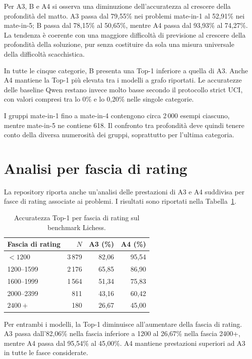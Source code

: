 Per A3, B e A4 si osserva una diminuzione dell'accuratezza al crescere della profondità del matto. A3 passa dal 79,55\% nei problemi mate-in-1 al 52,91\% nei mate-in-5; B passa dal 78,15\% al 50,65\%, mentre A4 passa dal 93,93\% al 74,27\%. La tendenza è coerente con una maggiore difficoltà di previsione al crescere della profondità della soluzione, pur senza costituire da sola una misura universale della difficoltà scacchistica.

In tutte le cinque categorie, B presenta una Top-1 inferiore a quella di A3. Anche A4 mantiene la Top-1 più elevata tra i modelli a grafo riportati. Le accuratezze delle baseline Qwen restano invece molto basse secondo il protocollo strict UCI, con valori compresi tra lo 0\% e lo 0,20\% nelle singole categorie.

I gruppi mate-in-1 fino a mate-in-4 contengono circa 2\,000 esempi ciascuno, mentre mate-in-5 ne contiene 618. Il confronto tra profondità deve quindi tenere conto della diversa numerosità dei gruppi, soprattutto per l'ultima categoria.

\section{Analisi per fascia di rating}

La repository riporta anche un'analisi delle prestazioni di A3 e A4 suddivisa per fasce di rating associate ai problemi. I risultati sono riportati nella Tabella~\ref{tab:rating-results}.

\begin{table}[htbp]
    \centering
    \small
    \caption{Accuratezza Top-1 per fascia di rating sul benchmark Lichess.}
    \label{tab:rating-results}
    \begin{tabular}{lrrr}
        \toprule
        Fascia di rating & \(N\) & A3 (\%) & A4 (\%) \\
        \midrule
        \(<1200\)       & 3\,879 & 82,06 & 95,54 \\
        1200--1599      & 2\,176 & 65,85 & 86,90 \\
        1600--1999      & 1\,564 & 51,34 & 75,83 \\
        2000--2399      & 811   & 43,16 & 60,42 \\
        \(2400+\)       & 180   & 26,67 & 45,00 \\
        \bottomrule
    \end{tabular}
\end{table}

Per entrambi i modelli, la Top-1 diminuisce all'aumentare della fascia di rating. A3 passa dall'82,06\% nella fascia inferiore a 1200 al 26,67\% nella fascia 2400+, mentre A4 passa dal 95,54\% al 45,00\%. A4 mantiene prestazioni superiori ad A3 in tutte le fasce considerate.

